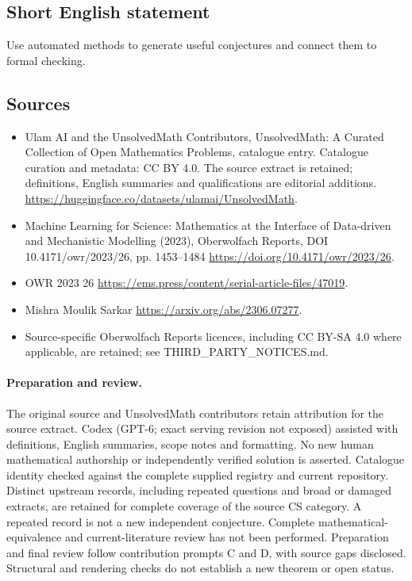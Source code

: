 \documentclass[11pt]{article}
\begin{document}
\subsection{Short English statement}
Use automated methods to generate useful conjectures and connect them to formal checking.
\subsection{Sources}
\begin{itemize}
\item[\hypertarget{source:statement:1}{S1}] Ulam AI and the UnsolvedMath Contributors, UnsolvedMath: A Curated Collection of Open Mathematics Problems, catalogue entry. Catalogue curation and metadata: CC BY 4.0. The source extract is retained; definitions, English summaries and qualifications are editorial additions.
\url{https://huggingface.co/datasets/ulamai/UnsolvedMath}.
\item[\hypertarget{source:statement:2}{S2}] Machine Learning for Science: Mathematics at the Interface of Data-driven and Mechanistic Modelling (2023), Oberwolfach Reports, DOI 10.4171/owr/2023/26, pp. 1453--1484
\url{https://doi.org/10.4171/owr/2023/26}.
\item[\hypertarget{source:statement:3}{S3}] OWR 2023 26
\url{https://ems.press/content/serial-article-files/47019}.
\item[\hypertarget{source:statement:4}{S4}] Mishra Moulik Sarkar
\url{https://arxiv.org/abs/2306.07277}.
\item Source-specific Oberwolfach Reports licences, including CC BY-SA 4.0 where applicable, are retained; see THIRD\_PARTY\_NOTICES.md.
\end{itemize}
\paragraph{Preparation and review.}
The original source and UnsolvedMath contributors retain attribution for the source extract. Codex (GPT-6; exact serving revision not exposed) assisted with definitions, English summaries, scope notes and formatting. No new human mathematical authorship or independently verified solution is asserted. Catalogue identity checked against the complete supplied registry and current repository. Distinct upstream records, including repeated questions and broad or damaged extracts, are retained for complete coverage of the source CS category. A repeated record is not a new independent conjecture. Complete mathematical-equivalence and current-literature review has not been performed. Preparation and final review follow contribution prompts C and D, with source gaps disclosed. Structural and rendering checks do not establish a new theorem or open status.
\label{end:statement}
\end{document}
